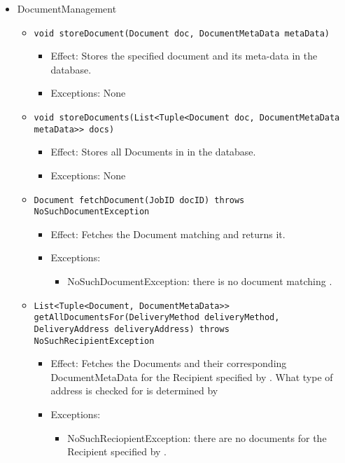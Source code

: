 \begin{itemize}
    \item DocumentManagement
	\begin{itemize}
		\item \texttt{void storeDocument(Document doc, DocumentMetaData metaData)}
		\begin{itemize}
			\item Effect: Stores the specified document and its meta-data in the database.
			\item Exceptions: None
		\end{itemize}

		\item \texttt{void storeDocuments(List<Tuple<Document doc, DocumentMetaData metaData>> docs)}
		\begin{itemize}
			\item Effect: Stores all Documents in  in the database.
			\item Exceptions: None
		\end{itemize}
		
		\item \texttt{Document fetchDocument(JobID docID) throws NoSuchDocumentException}
		\begin{itemize}
			\item Effect: Fetches the Document matching  and returns it.
			\item Exceptions: 
			\begin{itemize}
				\item NoSuchDocumentException: there is no document matching .
			\end{itemize}
		\end{itemize}

		\item \texttt{List<Tuple<Document, DocumentMetaData>> getAllDocumentsFor(DeliveryMethod deliveryMethod, DeliveryAddress deliveryAddress) throws NoSuchRecipientException}
		\begin{itemize}
			\item Effect: Fetches the Documents and their corresponding DocumentMetaData for the Recipient specified by . What type of address is checked for is determined by 
			\item Exceptions: 
			\begin{itemize}
				\item NoSuchReciopientException: there are no documents for the Recipient specified by .
			\end{itemize}
		\end{itemize}
	\end{itemize}


\end{itemize}
